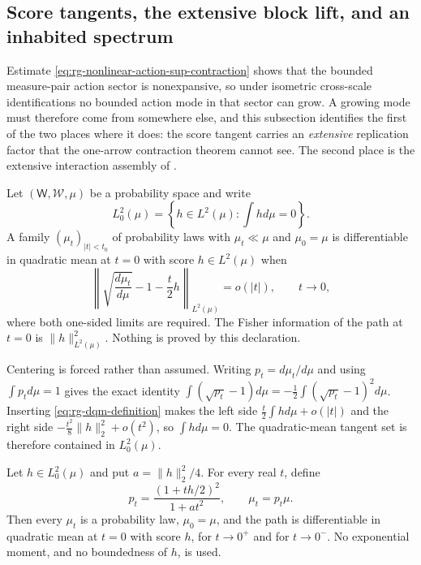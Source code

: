 \subsection{Score tangents, the extensive block lift, and an inhabited spectrum}
\label{sec:rg-score-lift}

Estimate \eqref{eq:rg-nonlinear-action-sup-contraction} shows that the bounded
measure-pair action sector is nonexpansive, so under isometric cross-scale
identifications no bounded action mode in that sector can grow.  A growing mode
must therefore come from somewhere else, and this subsection identifies the
first of the two places where it does: the score tangent carries an
\emph{extensive} replication factor that the one-arrow contraction theorem
cannot see.  The second place is the extensive interaction assembly of
.

Let \((\mathsf W,\mathscr W,\mu)\) be a probability space and write
\begin{equation}
 L^2_0(\mu)
 =\left\{h\in L^2(\mu):\int h d\mu=0\right\}.
 \label{eq:rg-centered-tangent}
\end{equation}
A family \((\mu_t)_{\lvert t\rvert<t_0}\) of probability laws with
\(\mu_t\ll\mu\) and \(\mu_0=\mu\) is differentiable in quadratic mean at
\(t=0\) with score \(h\in L^2(\mu)\) when
\begin{equation}
 \left\lVert
 \sqrt{\frac{d\mu_t}{d\mu}}-1-\frac t2h
 \right\rVert_{L^2(\mu)}
 =o(\lvert t\rvert),
 \qquad t\to0,
 \label{eq:rg-dqm-definition}
\end{equation}
where both one-sided limits are required.  The Fisher information of the path
at \(t=0\) is \(\lVert h\rVert_{L^2(\mu)}^2\).  Nothing is proved by this
declaration. 

Centering is forced rather than assumed.  Writing \(p_t=d\mu_t/d\mu\) and using
\(\int p_t d\mu=1\) gives the exact identity
\(\int(\sqrt{p_t}-1) d\mu=-\tfrac12\int(\sqrt{p_t}-1)^2 d\mu\).  Inserting
\eqref{eq:rg-dqm-definition} makes the left side
\(\tfrac t2\int h d\mu+o(\lvert t\rvert)\) and the right side
\(-\tfrac{t^2}8\lVert h\rVert_2^2+o(t^2)\), so \(\int h d\mu=0\).  The
quadratic-mean tangent set is therefore contained in \(L^2_0(\mu)\).

Let \(h\in L^2_0(\mu)\) and put \(a=\lVert h\rVert_2^2/4\).  For every real
\(t\), define
\begin{equation}
 p_t=\frac{(1+th/2)^2}{1+at^2},
 \qquad
 \mu_t=p_t\mu.
 \label{eq:rg-quadratic-score-path}
\end{equation}
Then every \(\mu_t\) is a probability law, \(\mu_0=\mu\), and the path is
differentiable in quadratic mean at \(t=0\) with score \(h\), for
\(t\to0^+\) and for \(t\to0^-\).  No exponential moment, and no boundedness of
\(h\), is used. 

